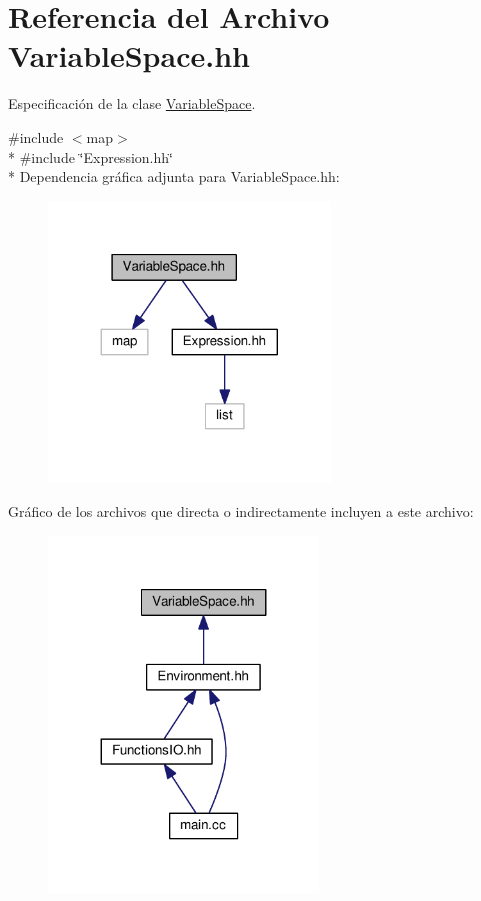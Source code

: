 \hypertarget{_variable_space_8hh}{}\section{Referencia del Archivo Variable\+Space.\+hh}
\label{_variable_space_8hh}


Especificación de la clase \hyperlink{class_variable_space}{Variable\+Space}.  


{\ttfamily \#include $<$map$>$}\\*
{\ttfamily \#include \char`\"{}Expression.\+hh\char`\"{}}\\*
Dependencia gráfica adjunta para Variable\+Space.\+hh\+:\nopagebreak
\begin{figure}[H]
\begin{center}
\leavevmode
\includegraphics[width=212pt]{_variable_space_8hh__incl}
\end{center}
\end{figure}
Gráfico de los archivos que directa o indirectamente incluyen a este archivo\+:\nopagebreak
\begin{figure}[H]
\begin{center}
\leavevmode
\includegraphics[width=203pt]{_variable_space_8hh__dep__incl}
\end{center}
\end{figure}

